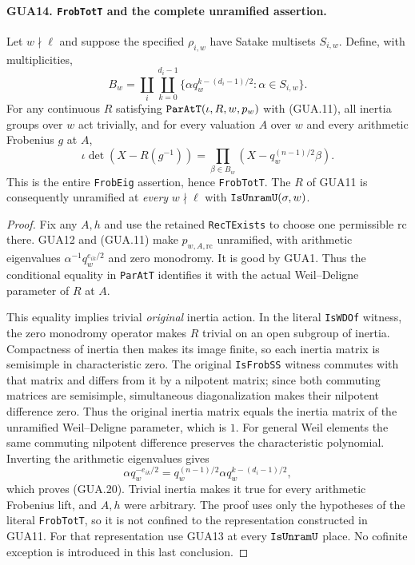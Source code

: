 \documentclass[11pt,a4paper]{article}
\numberwithin{equation}{section}
\theoremstyle{remark}\newtheorem{remark}[theorem]{Remark}
\begin{document}
\paragraph{GUA14. \texttt{Frob\allowbreak Tot\allowbreak T} and the complete unramified assertion.}
\label{claim:GUA14}
Let $w\nmid\ell$ and suppose the specified
$\rho_{i,w}$ have Satake multisets $S_{i,w}$.
Define, with multiplicities,
\[
 B_w=\coprod_i\coprod_{k=0}^{d_i-1}
       \{\alpha q_w^{k-(d_i-1)/2}:\alpha\in S_{i,w}\}.
                                                        \tag{GUA.19}
\]
For any continuous $R$ satisfying
$\texttt{Par\allowbreak At\allowbreak T}(\iota,R,w,p_w)$ with (GUA.11),
all inertia groups over $w$ act trivially, and for
every valuation $A$ over $w$ and every arithmetic
Frobenius $g$ at $A$,
\[
 \iota\det(X-R(g^{-1}))
   =\prod_{\beta\in B_w}(X-q_w^{(n-1)/2}\beta).
                                                        \tag{GUA.20}
\]
This is the entire \texttt{Frob\allowbreak Eig} assertion, hence
\texttt{Frob\allowbreak Tot\allowbreak T}.  The $R$ of GUA11 is consequently
unramified at \emph{every} $w\nmid\ell$ with
$\texttt{Is\allowbreak Unram\allowbreak U}(\sigma,w)$.
\begin{proof}
Fix any $A,h$ and use the retained \texttt{Rec\allowbreak TExists}
to choose one permissible $\mathrm{rc}$ there.  GUA12
and (GUA.11) make $p_{w,A,\mathrm{rc}}$ unramified,
with arithmetic eigenvalues
$\alpha^{-1}q_w^{e_{ik}/2}$ and zero monodromy.
It is good by GUA1.  Thus the conditional equality
in \texttt{Par\allowbreak At\allowbreak T} identifies it with the actual
Weil--Deligne parameter of $R$ at $A$.

This equality implies trivial \emph{original} inertia
action.  In the literal \texttt{Is\allowbreak WDOf} witness, the
zero monodromy operator makes $R$ trivial on an open
subgroup of inertia.  Compactness of inertia then
makes its image finite, so each inertia matrix is
semisimple in characteristic zero.  The original
\texttt{Is\allowbreak Frob\allowbreak SS} witness commutes with that matrix
and differs from it by a nilpotent matrix; since
both commuting matrices are semisimple, simultaneous
diagonalization makes their nilpotent difference zero.
Thus the original inertia matrix equals the inertia
matrix of the unramified Weil--Deligne parameter,
which is $1$.  For general Weil elements the same
commuting nilpotent difference preserves the
characteristic polynomial.
Inverting the arithmetic eigenvalues gives
\[
 \alpha q_w^{-e_{ik}/2}
    =q_w^{(n-1)/2}\alpha q_w^{k-(d_i-1)/2},
\]
which proves (GUA.20).  Trivial inertia makes it true
for every arithmetic Frobenius lift, and $A,h$ were
arbitrary.  The proof uses only the hypotheses of
the literal \texttt{Frob\allowbreak Tot\allowbreak T}, so it is not confined
to the representation constructed in GUA11.
For that representation use GUA13 at every
$\texttt{Is\allowbreak Unram\allowbreak U}$ place.  No cofinite exception
is introduced in this last conclusion.
\end{proof}
\end{document}
